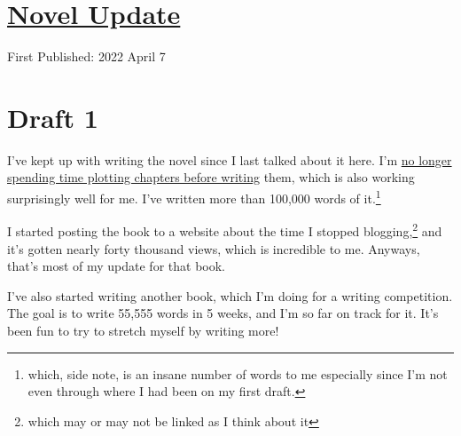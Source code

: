 \documentclass[12pt]{article}[titlepage]
\newcommand{\1}{\={a}}
\newcommand{\2}{\={e}}
\newcommand{\3}{\={\i}}
\newcommand{\4}{\=o}
\newcommand{\5}{\=u}
\newcommand{\6}{\={A}}
\renewcommand{\,}{\textsuperscript{,}}
\begin{document}
\doublespacing
\section{\href{novel-update-9.html}{Novel Update}}
First Published: 2022 April 7


\section{Draft 1}
I've kept up with writing the novel since I last talked about it here.
I'm \href{novel-update-8.html}{no longer spending time plotting chapters before writing} them, which is also working surprisingly well for me.
I've written more than 100,000 words of it.\footnote{which, side note, is an insane number of words to me especially since I'm not even through where I had been on my first draft.}

I started posting the book to a website about the time I stopped blogging,\footnote{which may or may not be linked as I think about it} and it's gotten nearly forty thousand views, which is incredible to me.
Anyways, that's most of my update for that book.

I've also started writing another book, which I'm doing for a writing competition.
The goal is to write 55,555 words in 5 weeks, and I'm so far on track for it.
It's been fun to try to stretch myself by writing more!
\end{document}
